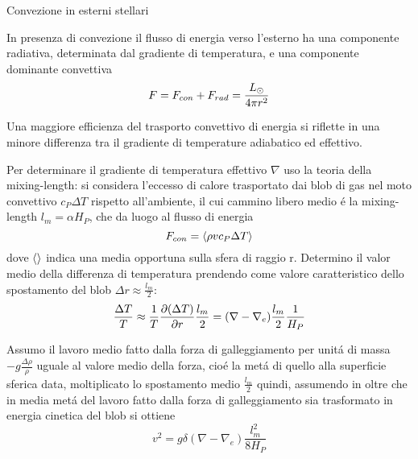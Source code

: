 \begin{wordonframe}{Convezione in esterni stellari}

In presenza di convezione il flusso di energia verso l'esterno ha una componente radiativa, determinata dal gradiente di temperatura, e una componente dominante convettiva 
\begin{equation*}\label{eq:radconvflux}
F=F_{con}+F_{rad}=\frac{\lsun{}}{4\pi r^2}
\end{equation*}

Una maggiore efficienza del trasporto convettivo di energia si riflette in una minore differenza tra il gradiente di temperature adiabatico ed effettivo.

\begin{figure}[!h]

\end{figure}

Per determinare il gradiente di temperatura effettivo $\nabla$ uso la teoria della mixing-length:
si considera l'eccesso di calore trasportato dai blob di gas nel moto convettivo $c_P\Delta T$ rispetto all'ambiente, il cui cammino libero medio \'e la mixing-length $l_m=\alpha H_P$, che da luogo al flusso di energia
\begin{equation*}
F_{con}=\exv{\rho vc_P\Delta T}\label{eq:convectiveflux}
\end{equation*}
dove $\exv{}$ indica una media opportuna sulla sfera di raggio r. Determino il valor medio della differenza di temperatura prendendo come valore caratteristico dello spostamento del blob $\Delta r\approx\frac{l_m}{2}$:
\begin{equation*}
\frac{\Delta T}{T}\approx\frac{1}{T}\PDy{r}{(\Delta T)}\frac{l_m}{2}=(\nabla-\nabla_e)\frac{l_m}{2}\frac{1}{H_P}\label{eq:blobambdiff}
\end{equation*}

Assumo il lavoro medio fatto dalla forza di galleggiamento per unit\'a di massa $-g\frac{\Delta\rho}{\rho}$ uguale al valore medio della forza, cio\'e la met\'a di quello alla superficie sferica data, moltiplicato lo spostamento medio $\frac{l_m}{2}$ quindi, assumendo in oltre che in media met\'a del lavoro fatto dalla forza di galleggiamento sia trasformato in energia cinetica del blob si ottiene
\begin{equation*}
v^2=g\delta(\nabla-\nabla_e)\frac{l_m^2}{8H_P}\label{eq:blobvelocity}
\end{equation*}


\end{wordonframe}
